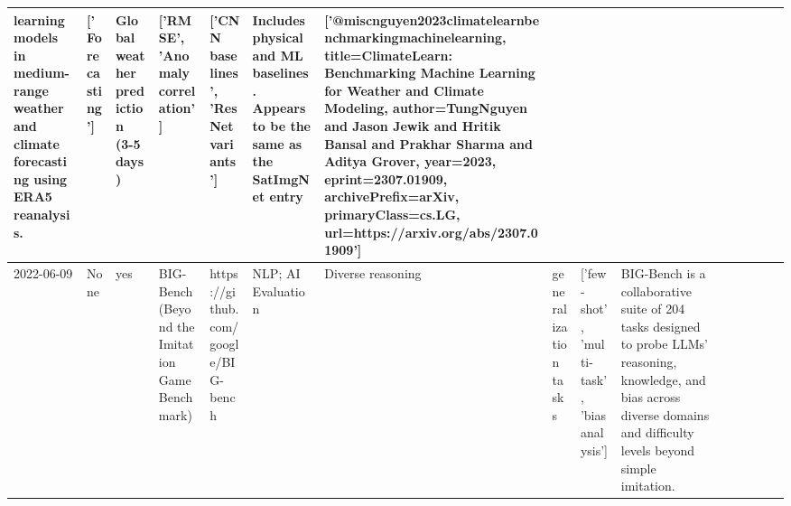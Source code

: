 \begin{landscape}
\begin{longtable}{|X|X|X|X|X|X|X|X|X|X|X|X|X|X|X|}
learning models in medium-range weather and climate forecasting using ERA5 reanalysis.
 & ['Forecasting'] & Global weather prediction (3-5 days) & ['RMSE', 'Anomaly correlation'] & ['CNN baselines', 'ResNet variants'] & Includes physical and ML baselines. Appears to be the same as the SatImgNet entry & ['@misc{nguyen2023climatelearnbenchmarkingmachinelearning, title={ClimateLearn: Benchmarking Machine Learning for Weather and Climate Modeling}, author={TungNguyen and Jason Jewik and Hritik Bansal and Prakhar Sharma and Aditya Grover}, year={2023}, eprint={2307.01909}, archivePrefix={arXiv}, primaryClass={cs.LG}, url={https://arxiv.org/abs/2307.01909}}'] \\ \hline
2022-06-09 & None & yes & BIG-Bench (Beyond the Imitation Game Benchmark) & https://github.com/google/BIG-bench & NLP; AI Evaluation & Diverse reasoning & generalization tasks & ['few-shot', 'multi-task', 'bias analysis'] & BIG-Bench is a collaborative suite of 204 tasks designed to probe LLMs' reasoning, 
knowledge, and bias across diverse domains and difficulty levels beyond simple imitation.

\end{longtable}
\end{landscape}
